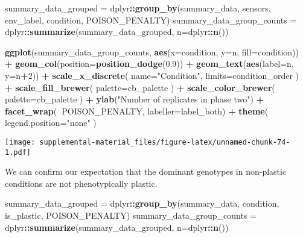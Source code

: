 \documentclass[]{book}
\newenvironment{Shaded}{\begin{snugshade}}{\end{snugshade}}
\newcommand{\DataTypeTok}[1]{\textcolor[rgb]{0.13,0.29,0.53}{#1}}
\newcommand{\DecValTok}[1]{\textcolor[rgb]{0.00,0.00,0.81}{#1}}
\newcommand{\FloatTok}[1]{\textcolor[rgb]{0.00,0.00,0.81}{#1}}
\newcommand{\KeywordTok}[1]{\textcolor[rgb]{0.13,0.29,0.53}{\textbf{#1}}}
\newcommand{\NormalTok}[1]{#1}
\newcommand{\OperatorTok}[1]{\textcolor[rgb]{0.81,0.36,0.00}{\textbf{#1}}}
\newcommand{\StringTok}[1]{\textcolor[rgb]{0.31,0.60,0.02}{#1}}
\begin{document}
\begin{Shaded}
\begin{Highlighting}[]
\NormalTok{summary_data_grouped =}\StringTok{ }\NormalTok{dplyr}\OperatorTok{::}\KeywordTok{group_by}\NormalTok{(summary_data, sensors, env_label, condition, POISON_PENALTY)}
\NormalTok{summary_data_group_counts =}\StringTok{ }\NormalTok{dplyr}\OperatorTok{::}\KeywordTok{summarize}\NormalTok{(summary_data_grouped, }\DataTypeTok{n=}\NormalTok{dplyr}\OperatorTok{::}\KeywordTok{n}\NormalTok{())}

\KeywordTok{ggplot}\NormalTok{(summary_data_group_counts, }\KeywordTok{aes}\NormalTok{(}\DataTypeTok{x=}\NormalTok{condition, }\DataTypeTok{y=}\NormalTok{n, }\DataTypeTok{fill=}\NormalTok{condition)) }\OperatorTok{+}
\StringTok{  }\KeywordTok{geom_col}\NormalTok{(}\DataTypeTok{position=}\KeywordTok{position_dodge}\NormalTok{(}\FloatTok{0.9}\NormalTok{)) }\OperatorTok{+}
\StringTok{  }\KeywordTok{geom_text}\NormalTok{(}\KeywordTok{aes}\NormalTok{(}\DataTypeTok{label=}\NormalTok{n, }\DataTypeTok{y=}\NormalTok{n}\OperatorTok{+}\DecValTok{2}\NormalTok{)) }\OperatorTok{+}
\StringTok{  }\KeywordTok{scale_x_discrete}\NormalTok{(}
    \DataTypeTok{name=}\StringTok{"Condition"}\NormalTok{,}
    \DataTypeTok{limits=}\NormalTok{condition_order}
\NormalTok{  ) }\OperatorTok{+}
\StringTok{  }\KeywordTok{scale_fill_brewer}\NormalTok{(}
    \DataTypeTok{palette=}\NormalTok{cb_palette}
\NormalTok{  ) }\OperatorTok{+}
\StringTok{  }\KeywordTok{scale_color_brewer}\NormalTok{(}
    \DataTypeTok{palette=}\NormalTok{cb_palette}
\NormalTok{  ) }\OperatorTok{+}
\StringTok{  }\KeywordTok{ylab}\NormalTok{(}\StringTok{"Number of replicates in phase two"}\NormalTok{) }\OperatorTok{+}
\StringTok{  }\KeywordTok{facet_wrap}\NormalTok{(}\OperatorTok{~}\NormalTok{POISON_PENALTY, }\DataTypeTok{labeller=}\NormalTok{label_both) }\OperatorTok{+}
\StringTok{  }\KeywordTok{theme}\NormalTok{(}
    \DataTypeTok{legend.position=}\StringTok{"none"}
\NormalTok{  )}
\end{Highlighting}
\end{Shaded}

\texttt{[image: supplemental-material\_files/figure-latex/unnamed-chunk-74-1.pdf]}

We can confirm our expectation that the dominant genotypes in non-plastic conditions are not phenotypically plastic.

\begin{Shaded}
\begin{Highlighting}[]
\NormalTok{summary_data_grouped =}\StringTok{ }\NormalTok{dplyr}\OperatorTok{::}\KeywordTok{group_by}\NormalTok{(summary_data, condition, is_plastic, POISON_PENALTY)}
\NormalTok{summary_data_group_counts =}\StringTok{ }\NormalTok{dplyr}\OperatorTok{::}\KeywordTok{summarize}\NormalTok{(summary_data_grouped, }\DataTypeTok{n=}\NormalTok{dplyr}\OperatorTok{::}\KeywordTok{n}\NormalTok{())}
\end{Highlighting}
\end{Shaded}
\end{document}
